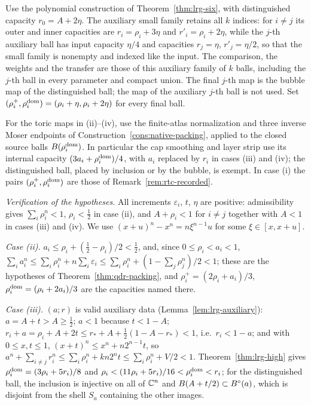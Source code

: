 \begin{construction}
\begin{enumerate}[label=(\roman*)]
\[ \]
 Use the polynomial construction of Theorem~\ref{thm:lrg-six}, with distinguished capacity
 $r_0=A+2\eta$. The auxiliary small family retains all $k$ indices: for $i\ne j$ its outer and
 inner capacities are $r_i=\rho_i+3\eta$ and $r'_i=\rho_i+2\eta$, while the $j$-th auxiliary
 ball has input capacity $\eta/4$ and capacities $r_j=\eta$, $r'_j=\eta/2$, so that the small family is nonempty and
 indexed like the input. The comparison, the weights and the transfer are those of this auxiliary family of $k$ balls,
 including the $j$-th ball in every parameter and compact union. The final $j$-th map is the bubble map of the
 distinguished ball; the map of the auxiliary $j$-th ball is not used.
 Set $(\rho_i^+,\rho_i^{\rm dom})=(\rho_i+\eta,\rho_i+2\eta)$ for every final ball.
\end{enumerate}
For the toric maps in (ii)--(iv), use the finite-atlas normalization and three inverse Moser endpoints of
Construction~\ref{cons:native-packing}, applied to the closed source balls $B(\rho_i^{\rm dom})$.
In particular the cap smoothing and layer strip use its internal capacity
$(3a_i+\rho_i^{\rm dom})/4$, with $a_i$ replaced by $r_i$ in cases (iii) and (iv); the distinguished ball, placed by
inclusion or by the bubble, is exempt.
In case (i) the pairs $(\rho_i^+,\rho_i^{\rm dom})$ are those of Remark~\ref{rem:rtc-recorded}.
\end{construction}
\emph{Verification of the hypotheses.} All increments $\varepsilon_i$, $t$, $\eta$ are positive: admissibility gives
$\sum_i\rho_i^n<1$, $\rho_i<\frac12$ in case (ii), and $A+\rho_i<1$ for $i\ne j$ together with $A<1$ in cases (iii) and (iv). We use
$(x+u)^n-x^n=n\xi^{n-1}u$ for some $\xi\in[x,x+u]$.

\emph{Case (ii).} $a_i\le\rho_i+(\frac12-\rho_i)/2<\frac12$, and, since $0\le\rho_i<a_i<1$,
$\sum_ia_i^n\le\sum_i\rho_i^n+n\sum_i\varepsilon_i\le\sum_i\rho_i^n+(1-\sum_j\rho_j^n)/2<1$; these are the hypotheses of
Theorem~\ref{thm:qdr-packing}, and $\rho_i^+=(2\rho_i+a_i)/3$, $\rho_i^{\rm dom}=(\rho_i+2a_i)/3$ are the capacities named there.

\emph{Case (iii).} $(a;r)$ is valid auxiliary data (Lemma~\ref{lem:lrg-auxiliary}): $a=A+t>A\ge\frac12$; $a<1$ because
$t<1-A$; $r_i+a=\rho_i+A+2t\le r_*+A+\frac12(1-A-r_*)<1$, i.e.\ $r_i<1-a$; and with $0\le x,t\le1$,
$(x+t)^n\le x^n+n2^{n-1}t$, so $a^n+\sum_{i\ne j}r_i^n\le\sum_i\rho_i^n+kn2^nt\le\sum_i\rho_i^n+V/2<1$. Theorem~\ref{thm:lrg-high}
gives $\rho_i^{\rm dom}=(3\rho_i+5r_i)/8$ and $\rho_i<(11\rho_i+5r_i)/16<\rho_i^{\rm dom}<r_i$; for the distinguished ball, the inclusion
is injective on all of $\mathbb{C}^n$ and $B(A+t/2)\subset B^{\circ}(a)$, which is disjoint from the shell $S_a$ containing the other images.

